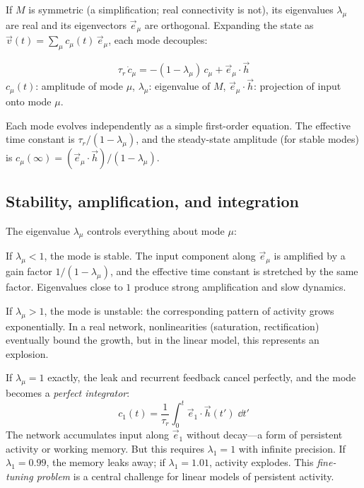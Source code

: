 If $M$ is symmetric (a simplification; real connectivity is not), its eigenvalues $\lambda_\mu$ are real and its eigenvectors $\vec{e}_\mu$ are orthogonal. Expanding the state as $\vec{v}(t) = \sum_\mu c_\mu(t)\,\vec{e}_\mu$, each mode decouples:

\begin{keyequation}
\begin{equation}
  \tau_r\,\dot{c}_\mu = -(1 - \lambda_\mu)\,c_\mu + \vec{e}_\mu \cdot \vec{h}
  \label{eq:eigenmode}
\end{equation}
\tcblower
$c_\mu(t)$: amplitude of mode $\mu$, \quad
$\lambda_\mu$: eigenvalue of $M$, \quad
$\vec{e}_\mu \cdot \vec{h}$: projection of input onto mode $\mu$.
\end{keyequation}

\noindent Each mode evolves independently as a simple first-order equation. The effective time constant is $\tau_r/(1 - \lambda_\mu)$, and the steady-state amplitude (for stable modes) is $c_\mu(\infty) = (\vec{e}_\mu \cdot \vec{h})/(1 - \lambda_\mu)$.

\subsection{Stability, amplification, and integration}

The eigenvalue $\lambda_\mu$ controls everything about mode $\mu$:

If $\lambda_\mu < 1$, the mode is stable. The input component along $\vec{e}_\mu$ is amplified by a gain factor $1/(1 - \lambda_\mu)$, and the effective time constant is stretched by the same factor. Eigenvalues close to $1$ produce strong amplification and slow dynamics.

If $\lambda_\mu > 1$, the mode is unstable: the corresponding pattern of activity grows exponentially. In a real network, nonlinearities (saturation, rectification) eventually bound the growth, but in the linear model, this represents an explosion.

If $\lambda_\mu = 1$ exactly, the leak and recurrent feedback cancel perfectly, and the mode becomes a \emph{perfect integrator}:
%
\begin{equation}
  c_1(t) = \frac{1}{\tau_r}\int_0^t \vec{e}_1 \cdot \vec{h}(t')\;\dd t'
  \label{eq:perfect-integrator}
\end{equation}
%
The network accumulates input along $\vec{e}_1$ without decay---a form of persistent activity or working memory. But this requires $\lambda_1 = 1$ with infinite precision. If $\lambda_1 = 0.99$, the memory leaks away; if $\lambda_1 = 1.01$, activity explodes. This \emph{fine-tuning problem} is a central challenge for linear models of persistent activity.

